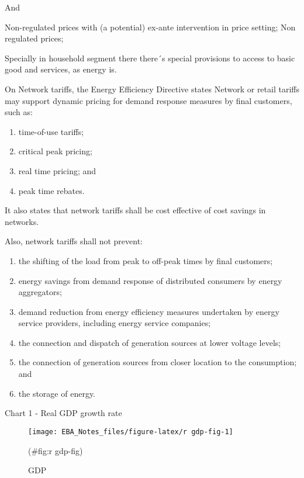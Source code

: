 \documentclass[]{book}
\providecommand{\tightlist}{%
  \setlength{\itemsep}{0pt}\setlength{\parskip}{0pt}}
\theoremstyle{definition}
\theoremstyle{definition}
\theoremstyle{definition}
\theoremstyle{remark}
\begin{document}
And

Non-regulated prices with (a potential) ex-ante intervention in price
setting; Non regulated prices;

Specially in household segment there there´s special provisions to
access to basic good and services, as energy is.

On Network tariffs, the Energy Efficiency Directive states Network or
retail tariffs may support dynamic pricing for demand response measures
by final customers, such as:

\begin{enumerate}
\def\labelenumi{(\alph{enumi})}
\tightlist
\item
  time-of-use tariffs;
\item
  critical peak pricing;
\item
  real time pricing; and
\item
  peak time rebates.
\end{enumerate}

It also states that network tariffs shall be cost effective of cost
savings in networks.

Also, network tariffs shall not prevent:

\begin{enumerate}
\def\labelenumi{(\alph{enumi})}
\tightlist
\item
  the shifting of the load from peak to off-peak times by final
  customers;
\item
  energy savings from demand response of distributed consumers by energy
  aggregators;
\item
  demand reduction from energy efficiency measures undertaken by energy
  service providers, including energy service companies;
\item
  the connection and dispatch of generation sources at lower voltage
  levels;
\item
  the connection of generation sources from closer location to the
  consumption; and
\item
  the storage of energy.
\end{enumerate}

Chart 1 - Real GDP growth rate

\begin{figure}

{\centering \texttt{[image: EBA\_Notes\_files/figure-latex/r gdp-fig-1]} 

}

\caption{GDP}(\#fig:r gdp-fig)
\end{figure}
\end{document}
